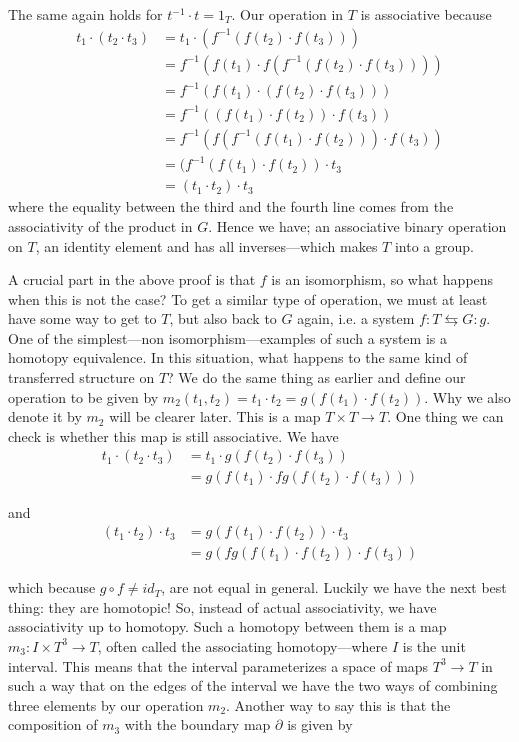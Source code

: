  
The same again holds for $ t^{-1}\cdot t = 1_T$. Our operation in $T$ is associative because
\begin{align*} 
t_1\cdot (t_2\cdot t_3) 
&= t_1\cdot (f^{-1}(f(t_2)\cdot f(t_3)))\\ 
&= f^{-1}(f(t_1)\cdot f(f^{-1}(f(t_2)\cdot f(t_3)))) \\ 
&= f^{-1}(f(t_1)\cdot (f(t_2)\cdot f(t_3))) \\ 
&= f^{-1}((f(t_1)\cdot f(t_2))\cdot f(t_3)) \\ 
&= f^{-1}(f(f^{-1}(f(t_1)\cdot f(t_2)))\cdot f(t_3)) \\ 
&= (f^{-1}(f(t_1)\cdot f(t_2))\cdot t_3 \\ 
&= (t_1\cdot t_2)\cdot t_3 
\end{align*}
where the equality between the third and the fourth line comes from the associativity of the product in $G$. Hence we have; an associative binary operation on $T$, an identity element and has all inverses---which makes $T$ into a group.

A crucial part in the above proof is that $f$ is an isomorphism, so what happens when this is not the case? To get a similar type of operation, we must at least have some way to get to $T$, but also back to $G$ again, i.e. a system $f\colon T\leftrightarrows G\colon g$. One of the simplest---non isomorphism---examples of such a system is a homotopy equivalence. In this situation, what happens to the same kind of transferred structure on $T$? We do the same thing as earlier and define our operation to be given by $m_2(t_1, t_2)=t_1\cdot t_2 = g(f(t_1)\cdot f(t_2))$. Why we also denote it by $ m_2$ will be clearer later. This is a map $ T\times T\longrightarrow T$. One thing we can check is whether this map is still associative. We have
\begin{align*} 
t_1\cdot (t_2 \cdot t_3) 
&= t_1\cdot g(f(t_2)\cdot f(t_3)) \\ 
&= g(f(t_1)\cdot fg(f(t_2)\cdot f(t_3))) 
\end{align*}

and
\begin{align*} 
(t_1\cdot t_2) \cdot t_3 
&= g(f(t_1)\cdot f(t_2)) \cdot t_3\\ 
&= g(fg(f(t_1)\cdot f(t_2))\cdot f(t_3)) 
\end{align*}

which because $ g\circ f \neq id_T$, are not equal in general. Luckily we have the next best thing: they are homotopic! So, instead of actual associativity, we have associativity up to homotopy. Such a homotopy between them is a map $ m_3:I\times T^3\longrightarrow T$, often called the associating homotopy---where $ I$ is the unit interval. This means that the interval parameterizes a space of maps $ T^3\longrightarrow T$ in such a way that on the edges of the interval we have the two ways of combining three elements by our operation $ m_2$. Another way to say this is that the composition of $ m_3$ with the boundary map $ \partial$ is given by 

